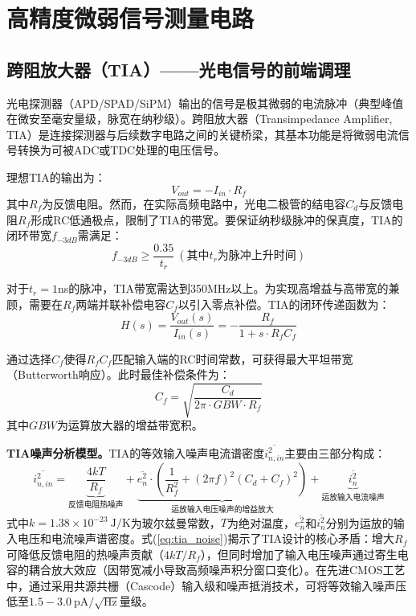 \documentclass[12pt,a4paper,openany,UTF8]{ctexbook}
\begin{document}
\section{高精度微弱信号测量电路}

\subsection{跨阻放大器（TIA）——光电信号的前端调理}

光电探测器（APD/SPAD/SiPM）输出的信号是极其微弱的电流脉冲（典型峰值在微安至毫安量级，脉宽在纳秒级）。跨阻放大器（Transimpedance Amplifier, TIA）是连接探测器与后续数字电路之间的关键桥梁，其基本功能是将微弱电流信号转换为可被ADC或TDC处理的电压信号。

理想TIA的输出为：
\begin{equation}\label{eq:tia_basic}
V_{out} = -I_{in} \cdot R_f
\end{equation}
其中$R_f$为反馈电阻。然而，在实际高频电路中，光电二极管的结电容$C_d$与反馈电阻$R_f$形成RC低通极点，限制了TIA的带宽。要保证纳秒级脉冲的保真度，TIA的闭环带宽$f_{-3dB}$需满足：
\begin{equation}\label{eq:tia_bw}
f_{-3dB} \geq \frac{0.35}{t_r} \ (\text{其中}t_r\text{为脉冲上升时间})
\end{equation}

对于$t_r = 1$ns的脉冲，TIA带宽需达到350MHz以上。为实现高增益与高带宽的兼顾，需要在$R_f$两端并联补偿电容$C_f$以引入零点补偿。TIA的闭环传递函数为：
\begin{equation}\label{eq:tia_transfer}
H(s) = \frac{V_{out}(s)}{I_{in}(s)} = -\frac{R_f}{1 + s \cdot R_f C_f}
\end{equation}

通过选择$C_f$使得$R_f C_f$匹配输入端的RC时间常数，可获得最大平坦带宽（Butterworth响应）。此时最佳补偿条件为：
\begin{equation}\label{eq:tia_comp}
C_f = \sqrt{\frac{C_d}{2\pi \cdot GBW \cdot R_f}}
\end{equation}
其中$GBW$为运算放大器的增益带宽积。

\textbf{TIA噪声分析模型。}TIA的等效输入噪声电流谱密度$\overline{i_{n,in}^2}$主要由三部分构成：
\begin{equation}\label{eq:tia_noise}
\overline{i_{n,in}^2} = \underbrace{\frac{4kT}{R_f}}_{\text{反馈电阻热噪声}} + \underbrace{\overline{e_n^2} \cdot \left(\frac{1}{R_f^2} + (2\pi f)^2 (C_d + C_f)^2\right)}_{\text{运放输入电压噪声的增益放大}} + \underbrace{\overline{i_n^2}}_{\text{运放输入电流噪声}}
\end{equation}
式中$k = 1.38 \times 10^{-23}\ \text{J/K}$为玻尔兹曼常数，$T$为绝对温度，$\overline{e_n^2}$和$\overline{i_n^2}$分别为运放的输入电压和电流噪声谱密度。式(\ref{eq:tia_noise})揭示了TIA设计的核心矛盾：增大$R_f$可降低反馈电阻的热噪声贡献（$4kT/R_f$），但同时增加了输入电压噪声通过寄生电容的耦合放大效应（因带宽减小导致高频噪声积分窗口变化）。在先进CMOS工艺中，通过采用共源共栅（Cascode）输入级和噪声抵消技术，可将等效输入噪声压低至$1.5-3.0\ \text{pA}/\sqrt{\text{Hz}}$量级。
\end{document}
